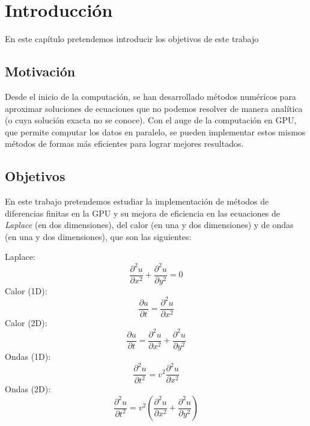 \chapter{Introducción}
\label{cap:introduccion}

\begin{resumen}
	En este capítulo pretendemos introducir los objetivos de este trabajo
\end{resumen}

\section{Motivación}
Desde el inicio de la computación, se han desarrollado métodos numéricos para aproximar soluciones de ecuaciones que no podemos resolver de manera analítica (o cuya solución exacta no se conoce). Con el auge de la computación en \ac{GPU}, que permite computar los datos en paralelo, se pueden implementar estos mismos métodos de formas más eficientes para lograr mejores resultados.


\section{Objetivos}
En este trabajo pretendemos estudiar la implementación de métodos de diferencias finitas en la \ac{GPU} y su mejora de eficiencia en las ecuaciones de \emph{Laplace} (en dos dimensiones), del calor (en una y dos dimensiones) y de ondas (en una y dos dimensiones), que son las siguientes:

\begin{multicols}{3}
	\centering
	Laplace:
	\begin{equation}
		\frac{\partial^2u}{\partial x^2}+\frac{\partial^2u}{\partial y^2}=0
	\end{equation}
	Calor (1D):
	\begin{equation}
		\frac{\partial u}{\partial t} = \frac{\partial ^2u}{\partial x^2} 
	\end{equation}
Calor (2D):
	\begin{equation}
		\frac{\partial u}{\partial t}=\frac{\partial^2u}{\partial x^2}+\frac{\partial^2u}{\partial y^2}
	\end{equation}
Ondas (1D):
	\begin{equation}
		\frac{\partial^2u}{\partial t^2}=v^2\frac{\partial^2u}{\partial x^2}
	\end{equation}
Ondas (2D):
	\begin{equation}
		\frac{\partial^2u}{\partial t^2}=v^2(\frac{\partial^2u}{\partial x^2}+\frac{\partial^2u}{\partial y^2})
	\end{equation}
\end{multicols}



